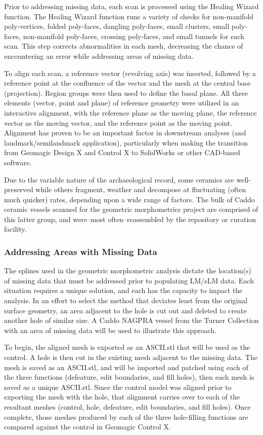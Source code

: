 \documentclass[preprint,12pt]{elsarticle}
\begin{document}
Prior to addressing missing data, each scan is processed using the Healing Wizard function. The Healing Wizard function runs a variety of checks for non-manifold poly-vertices, folded poly-faces, dangling poly-faces, small clusters, small poly-faces, non-manifold poly-faces, crossing poly-faces, and small tunnels for each scan. This step corrects abnormalities in each mesh, decreasing the chance of encountering an error while addressing areas of missing data.

To align each scan, a reference vector (revolving axis) was inserted, followed by a reference point at the confluence of the vector and the mesh at the central base (projection). Region groups were then used to define the basal plane. All three elements (vector, point and plane) of reference geometry were utilized in an interactive alignment, with the reference plane as the moving plane, the reference vector as the moving vector, and the reference point as the moving point. Alignment has proven to be an important factor in downstream analyses (and landmark/semilandmark application), particularly when making the transition from Geomagic Design X and Control X to SolidWorks or other CAD-based software. 

Due to the variable nature of the archaeological record, some ceramics are well-preserved while others fragment, weather and decompose at fluctuating (often much quicker) rates, depending upon a wide range of factors. The bulk of Caddo ceramic vessels scanned for the geometric morphometrics project are comprised of this latter group, and were--most often--reassembled by the repository or curation facility. 

\subsubsection{Addressing Areas with Missing Data}

The splines used in the geometric morphometric analysis dictate the location(s) of missing data that must be addressed prior to populating LM/sLM data. Each situation requires a unique solution, and each has the capacity to impact the analysis. In an effort to select the method that deviates least from the original surface geometry, an area adjacent to the hole is cut out and deleted to create another hole of similar size. A Caddo NAGPRA vessel from the Turner Collection with an area of missing data will be used to illustrate this approach.

To begin, the aligned mesh is exported as an ASCII.stl that will be used as the control. A hole is then cut in the existing mesh adjacent to the missing data. The mesh is saved as an ASCII.stl, and will be imported and patched using each of the three functions (defeature, edit boundaries, and fill holes), then each mesh is saved as a unique ASCII.stl. Since the control model was aligned prior to exporting the mesh with the hole, that alignment carries over to each of the resultant meshes (control, hole, defeature, edit boundaries, and fill holes). Once complete, those meshes produced by each of the three hole-filling functions are compared against the control in Geomagic Control X.
\end{document}
